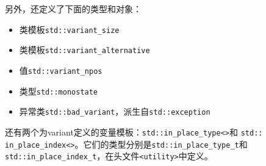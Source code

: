 另外，还定义了下面的类型和对象：
\begin{itemize}[leftmargin=*]
    \item 类模板\texttt{std::variant\_size}
    \item 类模板\texttt{std::variant\_alternative}
    \item 值\texttt{std::variant\_npos}
    \item 类型\texttt{std::monostate}
    \item 异常类\texttt{std::bad\_variant}，派生自\texttt{std::exception}
\end{itemize}
还有两个为variant定义的变量模板：\texttt{std::in\_place\_type<>}和 \texttt{std::\\
in\_place\_index<>}。它们的类型分别是\texttt{std::in\_place\_type\_t}和\\
\texttt{std::in\_place\_index\_t}，在头文件\texttt{<utility>}中定义。

